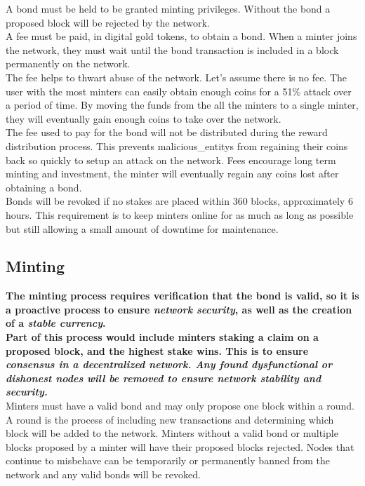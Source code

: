 \documentclass[12pt,a4paper]{article}
\begin{document}
  A \gls{bond} must be held to be granted minting privileges. Without the bond a
  proposed block will be rejected by the network.\\

  A fee must be paid, in digital gold tokens, to obtain a bond. When a minter
  joins the network, they must wait until the bond transaction is included in a
  block permanently on the network.\\

  The fee helps to thwart abuse of the network. Let's assume there is no fee.
  The user with the most minters can easily obtain enough coins for a 51\%
  attack over a period of time. By moving the funds from the all the minters to
  a single minter, they will eventually gain enough coins to take over the
  network.\\

  The fee used to pay for the bond will not be distributed during the reward
  distribution process. This prevents \glspl{malicious_entity} from regaining
  their coins back so quickly to setup an attack on the network. Fees encourage
  long term minting and investment, the minter will eventually regain any coins
  lost after obtaining a bond.\\

  Bonds will be revoked if no stakes are placed within 360 blocks, approximately
  6 hours. This requirement is to keep minters online for as much as long as
  possible but still allowing a small amount of downtime for maintenance.

  \subsection{Minting}
  \textbf{The minting process requires verification that the bond is valid, so
  it is a proactive process to ensure \textit{network security}, as well as the
  creation of a \textit{stable currency}.}\\

  \textbf{Part of this process would include minters staking a claim on a
  proposed block, and the highest stake wins. This is to ensure
  \textit{consensus in a decentralized network. Any found dysfunctional or
  dishonest nodes will be removed to ensure network stability and security.}}\\

  Minters must have a valid bond and may only propose one block within a round.
  A round is the process of including new transactions and determining which
  block will be added to the network. Minters without a valid bond or multiple
  blocks proposed by a minter will have their proposed blocks rejected. Nodes
  that continue to misbehave can be temporarily or permanently banned from the
  network and any valid bonds will be revoked.\\
\end{document}
